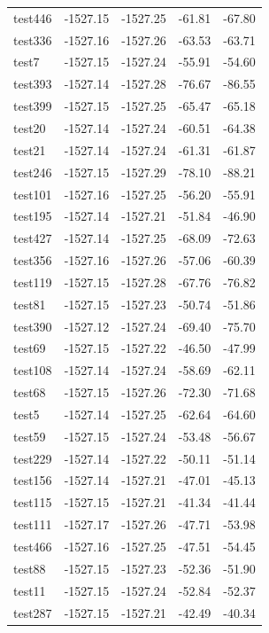 \documentclass[journal=jacsat,manuscript=article]{achemso}
\begin{document}
\begin{table}[b!]
\begin{tabular}{lrrrr}
test446 &  -1527.15 &  -1527.25 &  -61.81 &  -67.80 \\
test336 &  -1527.16 &  -1527.26 &  -63.53 &  -63.71 \\
test7   &  -1527.15 &  -1527.24 &  -55.91 &  -54.60 \\
test393 &  -1527.14 &  -1527.28 &  -76.67 &  -86.55 \\
test399 &  -1527.15 &  -1527.25 &  -65.47 &  -65.18 \\
test20  &  -1527.14 &  -1527.24 &  -60.51 &  -64.38 \\
test21  &  -1527.14 &  -1527.24 &  -61.31 &  -61.87 \\
test246 &  -1527.15 &  -1527.29 &  -78.10 &  -88.21 \\
test101 &  -1527.16 &  -1527.25 &  -56.20 &  -55.91 \\
test195 &  -1527.14 &  -1527.21 &  -51.84 &  -46.90 \\
test427 &  -1527.14 &  -1527.25 &  -68.09 &  -72.63 \\
test356 &  -1527.16 &  -1527.26 &  -57.06 &  -60.39 \\
test119 &  -1527.15 &  -1527.28 &  -67.76 &  -76.82 \\
test81  &  -1527.15 &  -1527.23 &  -50.74 &  -51.86 \\
test390 &  -1527.12 &  -1527.24 &  -69.40 &  -75.70 \\
test69  &  -1527.15 &  -1527.22 &  -46.50 &  -47.99 \\
test108 &  -1527.14 &  -1527.24 &  -58.69 &  -62.11 \\
test68  &  -1527.15 &  -1527.26 &  -72.30 &  -71.68 \\
test5   &  -1527.14 &  -1527.25 &  -62.64 &  -64.60 \\
test59  &  -1527.15 &  -1527.24 &  -53.48 &  -56.67 \\
test229 &  -1527.14 &  -1527.22 &  -50.11 &  -51.14 \\
test156 &  -1527.14 &  -1527.21 &  -47.01 &  -45.13 \\
test115 &  -1527.15 &  -1527.21 &  -41.34 &  -41.44 \\
test111 &  -1527.17 &  -1527.26 &  -47.71 &  -53.98 \\
test466 &  -1527.16 &  -1527.25 &  -47.51 &  -54.45 \\
test88  &  -1527.15 &  -1527.23 &  -52.36 &  -51.90 \\
test11  &  -1527.15 &  -1527.24 &  -52.84 &  -52.37 \\
test287 &  -1527.15 &  -1527.21 &  -42.49 &  -40.34 \\

\end{tabular}
\end{table}
\end{document}
